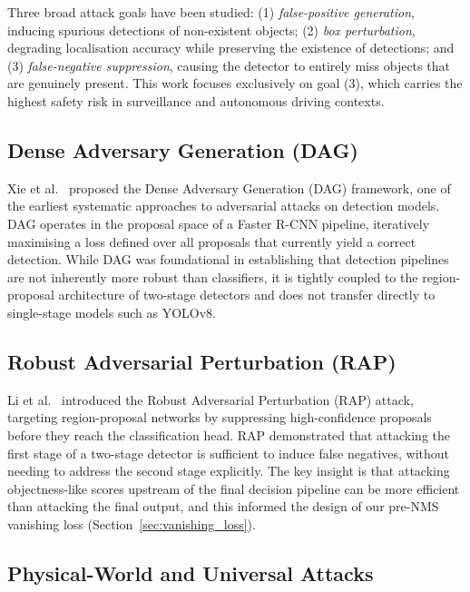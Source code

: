\documentclass[12pt,a4paper]{report}
\begin{document}
Three broad attack goals have been studied: (1) \emph{false-positive
generation}, inducing spurious detections of non-existent objects;
(2) \emph{box perturbation}, degrading localisation accuracy while
preserving the existence of detections; and (3) \emph{false-negative
suppression}, causing the detector to entirely miss objects that are
genuinely present. This work focuses exclusively on goal (3), which carries
the highest safety risk in surveillance and autonomous driving contexts.

\subsection{Dense Adversary Generation (DAG)}

Xie et al.\ \cite{xie2017adversarial} proposed the Dense Adversary Generation (DAG)
framework, one of the earliest systematic approaches to adversarial attacks on
detection models. DAG operates in the proposal space of a Faster R-CNN
pipeline, iteratively maximising a loss defined over all proposals that
currently yield a correct detection. While DAG was foundational in
establishing that detection pipelines are not inherently more robust than
classifiers, it is tightly coupled to the region-proposal architecture of
two-stage detectors and does not transfer directly to single-stage models
such as YOLOv8.

\subsection{Robust Adversarial Perturbation (RAP)}

Li et al.\ \cite{li2020robust} introduced the Robust Adversarial Perturbation
(RAP) attack, targeting region-proposal networks by suppressing high-confidence
proposals before they reach the classification head. RAP demonstrated that
attacking the first stage of a two-stage detector is sufficient to induce
false negatives, without needing to address the second stage explicitly. The
key insight is that attacking objectness-like scores upstream of the final
decision pipeline can be more efficient than attacking the final output, and this
informed the design of our pre-NMS vanishing loss (Section~\ref{sec:vanishing_loss}).

\subsection{Physical-World and Universal Attacks}
\end{document}
